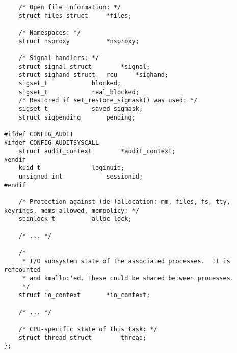 \begin{lstlisting}
	/* Open file information: */
	struct files_struct		*files;

	/* Namespaces: */
	struct nsproxy			*nsproxy;

	/* Signal handlers: */
	struct signal_struct		*signal;
	struct sighand_struct __rcu		*sighand;
	sigset_t			blocked;
	sigset_t			real_blocked;
	/* Restored if set_restore_sigmask() was used: */
	sigset_t			saved_sigmask;
	struct sigpending		pending;

#ifdef CONFIG_AUDIT
#ifdef CONFIG_AUDITSYSCALL
	struct audit_context		*audit_context;
#endif
	kuid_t				loginuid;
	unsigned int			sessionid;
#endif

	/* Protection against (de-)allocation: mm, files, fs, tty, keyrings, mems_allowed, mempolicy: */
	spinlock_t			alloc_lock;

	/* ... */

	/*
	 * I/O subsystem state of the associated processes.  It is refcounted
	 * and kmalloc'ed. These could be shared between processes.
	 */
	struct io_context		*io_context;

	/* ... */

	/* CPU-specific state of this task: */
	struct thread_struct		thread;
};
\end{lstlisting}

